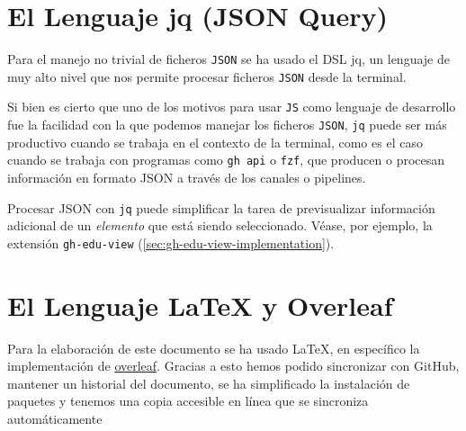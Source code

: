 \section{El Lenguaje jq (JSON Query)}

Para el manejo no trivial de ficheros \verb|JSON| se ha usado el \gls{DSL} jq\cite{jq}, un lenguaje de muy alto nivel que nos permite procesar ficheros \verb|JSON| desde la terminal. 

Si bien es cierto que uno de los motivos para usar \verb|JS| como lenguaje de desarrollo fue la facilidad con la que podemos manejar los ficheros \verb|JSON|, \verb|jq| puede ser más productivo cuando se trabaja en el contexto de la terminal, como es el caso cuando se trabaja con programas como \verb|gh api| o \verb"fzf", que  producen o procesan información en formato JSON a través de los canales o pipelines. 

Procesar JSON con \verb|jq| puede simplificar la tarea de previsualizar información adicional de un \emph{elemento} que está siendo seleccionado. Véase, por ejemplo, la extensión {\tt gh-edu-view} (\ref{sec:gh-edu-view-implementation}).

\section{El Lenguaje \LaTeX{} y Overleaf}
Para la elaboración de este documento se ha usado \LaTeX{}, 
en específico la implementación de \href{https://www.overleaf.com/}{overleaf}\cite{overlife}.
Gracias a esto hemos podido sincronizar con GitHub,
mantener un historial del documento, 
se ha simplificado la instalación de paquetes  y 
tenemos una copia accesible en línea que se sincroniza automáticamente
